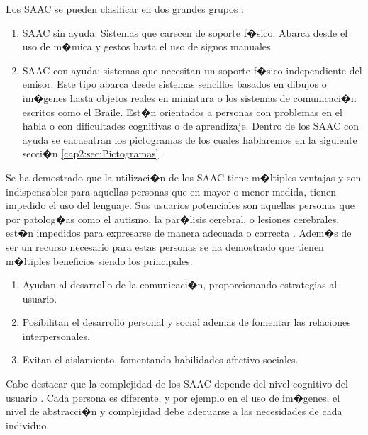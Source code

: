 Los SAAC se pueden clasificar en dos grandes grupos \citep{as2010, basil1990comunicacion, uribe2018apoyo}:

\begin{enumerate}
\item SAAC sin ayuda: Sistemas que carecen de soporte f�sico. Abarca desde el uso de m�mica y gestos hasta el uso de signos manuales.
\item SAAC con ayuda: sistemas que necesitan un soporte f�sico independiente del emisor. Este tipo abarca desde sistemas sencillos basados en dibujos o im�genes hasta objetos reales en miniatura o los sistemas de comunicaci�n escritos como el Braile. Est�n orientados a personas con problemas en el habla o con dificultades cognitivas o de aprendizaje. Dentro de los SAAC con ayuda se encuentran los pictogramas de los cuales hablaremos en la siguiente secci�n  \ref{cap2:sec:Pictogramas}.

\end{enumerate}
 
Se ha demostrado que la utilizaci�n de los SAAC tiene m�ltiples ventajas \citep{LorenzoAlvarezTFG2013} y son indispensables para aquellas personas que en mayor o menor medida, tienen impedido el uso del lenguaje. Sus usuarios potenciales son aquellas personas que por patolog�as como el autismo, la par�lisis cerebral, o lesiones  cerebrales, est�n impedidos para expresarse de manera adecuada o correcta \citep{WarrickAnneCSH2010}. Adem�s de ser un recurso necesario para estas personas se ha demostrado que tienen m�ltiples beneficios siendo los principales:
 
 \begin{enumerate}
 
 \item Ayudan al desarrollo de la comunicaci�n, proporcionando estrategias al usuario.
 \item Posibilitan el desarrollo personal y social ademas de fomentar las relaciones interpersonales.
 \item Evitan el aislamiento, fomentando habilidades afectivo-sociales.
 
  \end{enumerate}

  Cabe destacar que la complejidad de los SAAC depende del nivel cognitivo del usuario \citep{DoloresAbril2010}. Cada persona es diferente, y por ejemplo en el uso de im�genes, el nivel de abstracci�n y complejidad debe adecuarse a las necesidades de cada individuo. 

 
